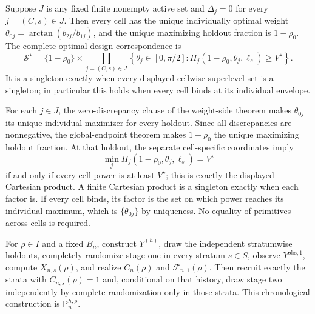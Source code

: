 Suppose \(J\) is any fixed finite nonempty active set and \(\Delta_j=0\) for every \(j=(C,s)\in J\).  Then every cell has the unique individually optimal weight \(\theta_{0j}=\arctan(b_{2j}/b_{1j})\), and the unique maximizing holdout fraction is \(1-\rho_0\).  The complete optimal-design correspondence is
\[
\mathcal S^\star=
\{1-\rho_0\}\times
\prod_{j=(C,s)\in J}
\left\{\theta_j\in[0,\pi/2]:
\Pi_j(1-\rho_0,\theta_j,\ell_s)\ge V^\star\right\}.
\]
It is a singleton exactly when every displayed cellwise superlevel set is a singleton; in particular this holds when every cell binds at its individual envelope.

For each \(j\in J\), the zero-discrepancy clause of the weight-side theorem makes \(\theta_{0j}\) its unique individual maximizer for every holdout.  Since all discrepancies are nonnegative, the global-endpoint theorem makes \(1-\rho_0\) the unique maximizing holdout fraction.  At that holdout, the separate cell-specific coordinates imply
\[
\min_j\Pi_j(1-\rho_0,\theta_j,\ell_s)=V^\star
\]
if and only if every cell power is at least \(V^\star\); this is exactly the displayed Cartesian product.  A finite Cartesian product is a singleton exactly when each factor is.  If every cell binds, its factor is the set on which power reaches its individual maximum, which is \(\{\theta_{0j}\}\) by uniqueness.  No equality of primitives across cells is required.

For \(\rho\in I\) and a fixed \(B_n\), construct \(Y^{(h)}\), draw the independent stratumwise holdouts, completely randomize stage one in every stratum \(s\in S\), observe \(Y^{\mathrm{obs},1}\), compute \(X_{n,s}(\rho)\), and realize \(C_n(\rho)\) and \(\mathcal F_{n,1}(\rho)\). Then recruit exactly the strata with \(C_{n,s}(\rho)=1\) and, conditional on that history, draw stage two independently by complete randomization only in those strata. This chronological construction is \(\mathsf P_n^{h,\rho}\).
